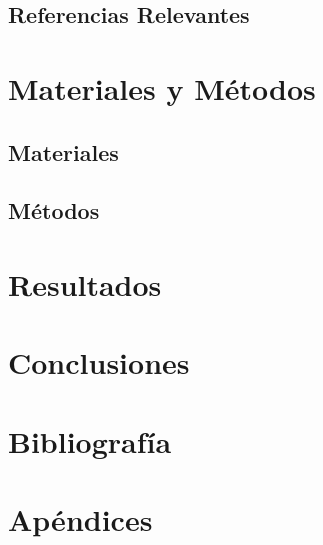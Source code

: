 \documentclass[12pt,titlepage,twoside,openright]{book}
\begin{document}
\section{Referencias Relevantes}

\chapter{Materiales y Métodos}
\label{cap:materialesymetodos}

\section{Materiales}

\section{Métodos}

\chapter{Resultados}
\label{cap:resultados}

\chapter{Conclusiones}
\label{cap:conclusiones}

\backmatter

\chapter{Bibliografía}
\label{cap:bibleografia}



\appendix
\chapter{Apéndices}
\label{ap:apendices}
\end{document}
